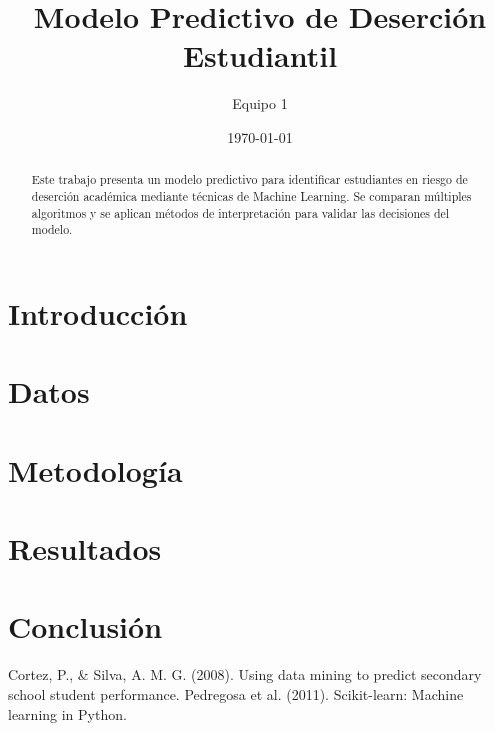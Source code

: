 \documentclass[10pt]{article}
\title{Modelo Predictivo de Deserción Estudiantil}
\author{Equipo 1}
\date{\today}
\begin{document}
\maketitle

\begin{abstract}
Este trabajo presenta un modelo predictivo para identificar estudiantes en riesgo de deserción académica mediante técnicas de Machine Learning. Se comparan múltiples algoritmos y se aplican métodos de interpretación para validar las decisiones del modelo.
\end{abstract}

\section{Introducción}

\section{Datos}

\section{Metodología}

\section{Resultados}

\section{Conclusión}


\begin{thebibliography}{9}
 Cortez, P., \& Silva, A. M. G. (2008). Using data mining to predict secondary school student performance.
 Pedregosa et al. (2011). Scikit-learn: Machine learning in Python.
\end{thebibliography}
\end{document}
